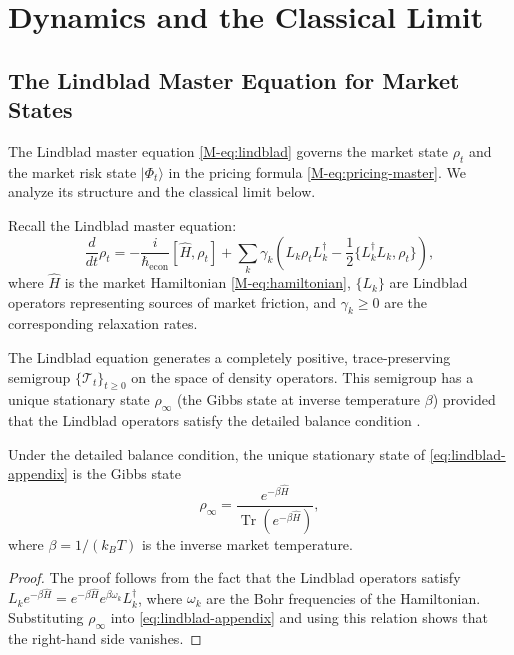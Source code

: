
\section{Dynamics and the Classical Limit}\label{app:classical-limit}

\subsection{The Lindblad Master Equation for Market States}

The Lindblad master equation \eqref{M-eq:lindblad} governs the market state
$\rho_t$ and the market risk state $|\Phi_t\rangle$ in the pricing formula
\eqref{M-eq:pricing-master}. We analyze its structure and the classical limit
below.

Recall the Lindblad master equation:
\begin{equation}\label{eq:lindblad-appendix}
    \frac{d}{dt} \rho_t = -\frac{i}{\hbar_{\mathrm{econ}}} [\hat{H}, \rho_t]
    + \sum_k \gamma_k
    \left( L_k \rho_t L_k^\dagger - \frac{1}{2} \{L_k^\dagger L_k, \rho_t\} \right),
\end{equation}
where $\hat{H}$ is the market Hamiltonian \eqref{M-eq:hamiltonian}, $\{L_k\}$ are
Lindblad operators representing sources of market friction, and $\gamma_k \geq 0$
are the corresponding relaxation rates.

The Lindblad equation generates a completely positive, trace-preserving semigroup
$\{\mathcal{T}_t\}_{t \geq 0}$ on the space of density operators. This semigroup
has a unique stationary state $\rho_\infty$ (the Gibbs state at inverse
temperature $\beta$) provided that the Lindblad operators satisfy the detailed
balance condition \citep{breuer2007theory}.

\begin{proposition}\label{prop:stationary-state}
Under the detailed balance condition, the unique stationary state of
\eqref{eq:lindblad-appendix} is the Gibbs state
\begin{equation*}
    \rho_\infty = \frac{e^{-\beta \hat{H}}}{\operatorname{Tr}(e^{-\beta \hat{H}})},
\end{equation*}
where $\beta = 1/(k_B T)$ is the inverse market temperature.
\end{proposition}

\begin{proof}
The proof follows from the fact that the Lindblad operators satisfy
$L_k e^{-\beta \hat{H}} = e^{-\beta \hat{H}} e^{\beta \omega_k} L_k^\dagger$,
where $\omega_k$ are the Bohr frequencies of the Hamiltonian. Substituting
$\rho_\infty$ into \eqref{eq:lindblad-appendix} and using this relation shows
that the right-hand side vanishes.
\end{proof}

